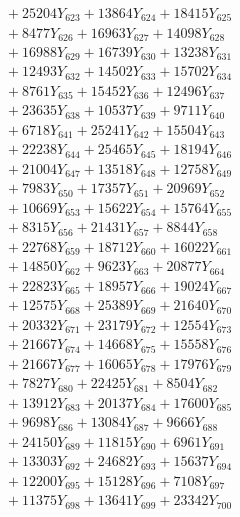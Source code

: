 \documentclass[a4paper,10pt]{article}
\begin{document}
{\begin{align}
&\;  + 25204 Y_{623} + 13864 Y_{624} + 18415 Y_{625} \\[0.3ex]
&\;  + 8477 Y_{626} + 16963 Y_{627} + 14098 Y_{628} \\[0.5ex]\allowbreak
&\;  + 16988 Y_{629} + 16739 Y_{630} + 13238 Y_{631} \\[0.3ex]
&\;  + 12493 Y_{632} + 14502 Y_{633} + 15702 Y_{634} \\[0.3ex]
&\;  + 8761 Y_{635} + 15452 Y_{636} + 12496 Y_{637} \\[0.3ex]
&\;  + 23635 Y_{638} + 10537 Y_{639} + 9711 Y_{640} \\[0.3ex]
&\;  + 6718 Y_{641} + 25241 Y_{642} + 15504 Y_{643} \\[0.3ex]
&\;  + 22238 Y_{644} + 25465 Y_{645} + 18194 Y_{646} \\[0.3ex]
&\;  + 21004 Y_{647} + 13518 Y_{648} + 12758 Y_{649} \\[0.3ex]
&\;  + 7983 Y_{650} + 17357 Y_{651} + 20969 Y_{652} \\[0.3ex]
&\;  + 10669 Y_{653} + 15622 Y_{654} + 15764 Y_{655} \\[0.3ex]
&\;  + 8315 Y_{656} + 21431 Y_{657} + 8844 Y_{658} \\[0.5ex]\allowbreak
&\;  + 22768 Y_{659} + 18712 Y_{660} + 16022 Y_{661} \\[0.3ex]
&\;  + 14850 Y_{662} + 9623 Y_{663} + 20877 Y_{664} \\[0.3ex]
&\;  + 22823 Y_{665} + 18957 Y_{666} + 19024 Y_{667} \\[0.3ex]
&\;  + 12575 Y_{668} + 25389 Y_{669} + 21640 Y_{670} \\[0.3ex]
&\;  + 20332 Y_{671} + 23179 Y_{672} + 12554 Y_{673} \\[0.3ex]
&\;  + 21667 Y_{674} + 14668 Y_{675} + 15558 Y_{676} \\[0.3ex]
&\;  + 21667 Y_{677} + 16065 Y_{678} + 17976 Y_{679} \\[0.3ex]
&\;  + 7827 Y_{680} + 22425 Y_{681} + 8504 Y_{682} \\[0.3ex]
&\;  + 13912 Y_{683} + 20137 Y_{684} + 17600 Y_{685} \\[0.3ex]
&\;  + 9698 Y_{686} + 13084 Y_{687} + 9666 Y_{688} \\[0.5ex]\allowbreak
&\;  + 24150 Y_{689} + 11815 Y_{690} + 6961 Y_{691} \\[0.3ex]
&\;  + 13303 Y_{692} + 24682 Y_{693} + 15637 Y_{694} \\[0.3ex]
&\;  + 12200 Y_{695} + 15128 Y_{696} + 7108 Y_{697} \\[0.3ex]
&\;  + 11375 Y_{698} + 13641 Y_{699} + 23342 Y_{700} \\[0.3ex]

\end{align}}
\end{document}
